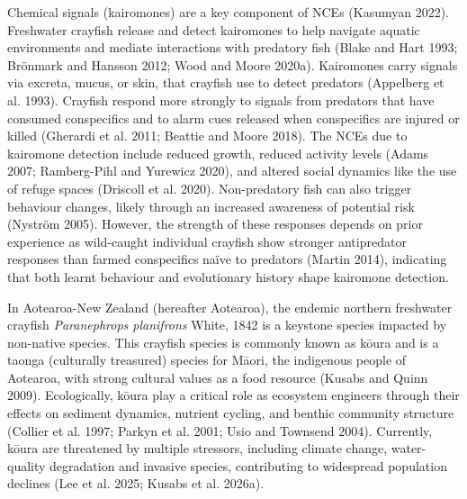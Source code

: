 \documentclass[
  12pt,
  a4paper,
  oneside]{scrbook}
\begin{document}
Chemical signals (kairomones) are a key component of NCEs (Kasumyan
2022). Freshwater crayfish release and detect kairomones to help
navigate aquatic environments and mediate interactions with predatory
fish (Blake and Hart 1993; Brönmark and Hansson 2012; Wood and Moore
2020a). Kairomones carry signals via excreta, mucus, or skin, that
crayfish use to detect predators (Appelberg et al. 1993). Crayfish
respond more strongly to signals from predators that have consumed
conspecifics and to alarm cues released when conspecifics are injured or
killed (Gherardi et al. 2011; Beattie and Moore 2018). The NCEs due to
kairomone detection include reduced growth, reduced activity levels
(Adams 2007; Ramberg-Pihl and Yurewicz 2020), and altered social
dynamics like the use of refuge spaces (Driscoll et al. 2020).
Non-predatory fish can also trigger behaviour changes, likely through an
increased awareness of potential risk (Nyström 2005). However, the
strength of these responses depends on prior experience as wild-caught
individual crayfish show stronger antipredator responses than farmed
conspecifics naïve to predators (Martin 2014), indicating that both
learnt behaviour and evolutionary history shape kairomone detection.

In Aotearoa-New Zealand (hereafter Aotearoa), the endemic northern
freshwater crayfish \emph{Paranephrops planifrons} White, 1842 is a
keystone species impacted by non-native species. This crayfish species
is commonly known as kōura and is a taonga (culturally treasured)
species for Māori, the indigenous people of Aotearoa, with strong
cultural values as a food resource (Kusabs and Quinn 2009).
Ecologically, kōura play a critical role as ecosystem engineers through
their effects on sediment dynamics, nutrient cycling, and benthic
community structure (Collier et al. 1997; Parkyn et al. 2001; Usio and
Townsend 2004). Currently, kōura are threatened by multiple stressors,
including climate change, water-quality degradation and invasive
species, contributing to widespread population declines (Lee et al.
2025; Kusabs et al. 2026a).
\end{document}
